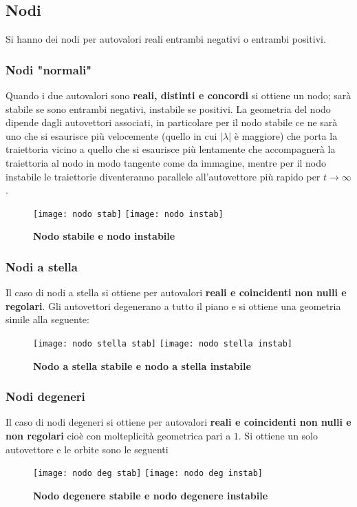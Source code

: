 \documentclass[a4paper]{article}
\begin{document}
	\subsection{Nodi}
	Si hanno dei nodi per autovalori reali entrambi negativi o entrambi positivi.
	\subsubsection{Nodi "normali"}
	Quando i due autovalori sono \textbf{reali, distinti e concordi} si ottiene un nodo; sarà stabile se sono entrambi negativi, instabile se positivi. La geometria del nodo dipende dagli autovettori associati, in particolare per il nodo stabile ce ne sarà uno che si esaurisce più velocemente (quello in cui $|\lambda|$ è maggiore) che porta la traiettoria vicino a quello che si esaurisce più lentamente che accompagnerà la traiettoria al nodo in modo tangente come da immagine, mentre per il nodo instabile le traiettorie diventeranno parallele all'autovettore più rapido per $t\to\infty$.
	\begin{figure}[H]
		\centering
		\texttt{[image: nodo stab]}%
		\quad\quad
		\texttt{[image: nodo instab]}
		\caption{\textbf{Nodo stabile e nodo instabile}}
	\end{figure}
	\subsubsection{Nodi a stella}
	Il caso di nodi a stella si ottiene per autovalori \textbf{reali e coincidenti non nulli e regolari}. Gli autovettori degenerano a tutto il piano e si ottiene una geometria simile alla seguente:
	\begin{figure}[htbp]
		\centering
		\texttt{[image: nodo stella stab]}%
		\quad\quad
		\texttt{[image: nodo stella instab]}
		\caption{\textbf{Nodo a stella stabile e nodo a stella instabile}}
	\end{figure}
	\subsubsection{Nodi degeneri}
		Il caso di nodi degeneri si ottiene per autovalori \textbf{reali e coincidenti non nulli e non regolari} cioè con molteplicità geometrica pari a $1$. Si ottiene un solo autovettore e le orbite sono le seguenti
	\begin{figure}[htbp]
		\centering
		\texttt{[image: nodo deg stab]}%
		\quad\quad
		\texttt{[image: nodo deg instab]}
		\caption{\textbf{Nodo degenere stabile e nodo degenere instabile}}
	\end{figure}
\end{document}
